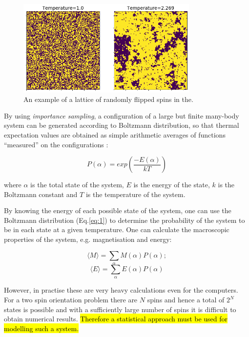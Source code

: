 \begin{figure}[h!]
	\label{fig:ising128}
	\includegraphics[width=0.8\textwidth]{figures/ising_lattice_128.png}
	\centering
	\caption{An example of a lattice of randomly flipped spins in the.}
\end{figure}

By using \textit{importance sampling}, a configuration of a large but finite many-body system can be generated according to Boltzmann distribution, so that thermal expectation values are obtained as simple arithmetic averages of functions “measured” on the configurations \cite{sandvik}:

\begin{equation}
	\label{eq:1}
	P(\alpha) = exp \left(\frac{-E(\alpha)}{kT} \right)
\end{equation}


where $\alpha$ is the total state of the system, $E$ is the energy of the state, $k$ is the Boltzmann constant and $T$ is the temperature of the system.

By knowing the energy of each possible state of the system, one can use the Boltzmann distribution (Eq.\ref{eq:1}) to determine the probability of the system to be in each state at a given temperature. One can calculate the macroscopic properties of the system, e.g. magnetisation and energy:

\begin{equation}
	\langle M \rangle = \sum_{\alpha} M(\alpha) P(\alpha);
\end{equation}
\begin{equation}
	\langle E \rangle = \sum_{\alpha} E(\alpha) P(\alpha)
\end{equation}

However, in practise these are very heavy calculations even for the computers. For a two spin orientation problem there are $N$ spins and hence a total of $2^{N}$ states is possible and with a sufficiently large number of spins it is difficult to obtain numerical results. \hl{Therefore a statistical approach must be used for modelling such a system.}

